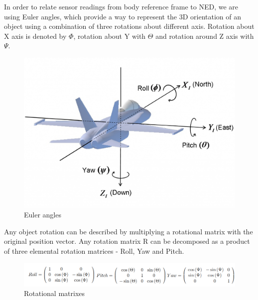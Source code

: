 In order to relate sensor readings from body reference frame to NED, we are using Euler angles, which provide a way to represent the 3D orientation of an object using a combination of three rotations about different axis. Rotation about X axis is denoted by $\Phi$, rotation about Y with $\Theta$ and rotation around Z axis with $\Psi$. 

\begin{figure}[H]
    \begin{center}
    \includegraphics[scale = 0.5]{pictures/IMU/Euler_angles.png}
    \end{center}
    \caption{Euler angles}
    \label{fig:my_label}
\end{figure}

Any object rotation can be described by multiplying a rotational matrix with the original position vector. Any rotation matrix R can be decomposed as a product of three elemental rotation matrices - Roll, Yaw and Pitch.\newline
\begin{figure}[H]
    \begin{center}
    \includegraphics[scale = 0.7]{pictures/IMU/rotational_matrixes.png}
    \end{center}
    \caption{Rotational matrixes}
    \label{fig:my_label}
\end{figure}

